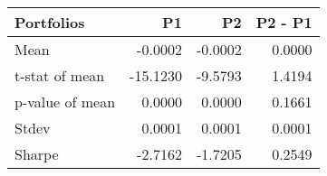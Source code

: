 \begin{tabular}{lrrr}
\toprule
Portfolios & P1 & P2 & P2 - P1 \\
\midrule
Mean & -0.0002 & -0.0002 & 0.0000 \\
t-stat of mean & -15.1230 & -9.5793 & 1.4194 \\
p-value of mean & 0.0000 & 0.0000 & 0.1661 \\
Stdev & 0.0001 & 0.0001 & 0.0001 \\
Sharpe & -2.7162 & -1.7205 & 0.2549 \\
\bottomrule
\end{tabular}

